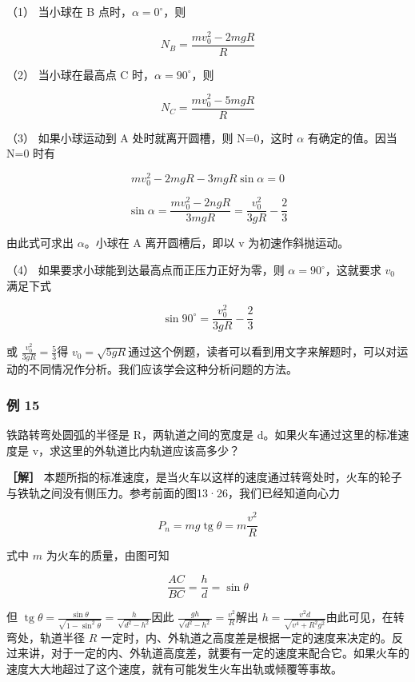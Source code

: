 （1） 当小球在 B 点时，\(\alpha=0^{\circ}\)，则

\[
N _ {B} = \frac {m v _ {0} ^ {2} - 2 m g R}{R}
\]

（2） 当小球在最高点 C 时，\(\alpha=90^{\circ}\)，则

\[
N _ {C} = \frac {m v _ {0} ^ {2} - 5 m g R}{R}
\]

（3） 如果小球运动到 A 处时就离开圆槽，则 N=0，这时 \(\alpha\)
有确定的值。因当 N=0 时有

\[
m v _ {0} ^ {2} - 2 m g R - 3 m g R \sin \alpha = 0
\]

\[
\sin \alpha = \frac {m v _ {0} ^ {2} - 2 n g R}{3 m g R} = \frac {v _ {0} ^ {2}}{3 g R} - \frac {2}{3}
\]

由此式可求出 \(\alpha\)。小球在 A 离开圆槽后，即以 v 为初速作斜抛运动。

（4） 如果要求小球能到达最高点而正压力正好为零，则
\(\alpha=90^{\circ}\)，这就要求 \(v_{0}\) 满足下式

\[
\sin 90 ^ {\circ} = \frac {v _ {0} ^ {2}}{3 g R} - \frac {2}{3}
\]

或 \(\frac{v_0^2}{3gR} = \frac{5}{3}\)得
\(v_{0} = \sqrt{5gR}\)通过这个例题，读者可以看到用文字来解题时，可以对运动的不同情况作分析。我们应该学会这种分析问题的方法。

\subsubsection{例 15}\label{ux4f8b-15-2}

铁路转弯处圆弧的半径是 R，两轨道之间的宽度是
d。如果火车通过这里的标准速度是 v，求这里的外轨道比内轨道应该高多少？

\textbf{［解］}
本题所指的标准速度，是当火车以这样的速度通过转弯处时，火车的轮子与铁轨之间没有侧压力。参考前面的图13·26，我们已经知道向心力

\[
P _ {n} = m g \operatorname{tg} \theta = m \frac {v ^ {2}}{R}
\]

式中 \(m\) 为火车的质量，由图可知

\[
\frac {A C}{B C} = \frac {h}{d} = \sin \theta
\]

但
\(\operatorname{tg}\theta = \frac{\sin\theta}{\sqrt{1 - \sin^2\theta}} = \frac{h}{\sqrt{d^2 - h^2}}\)因此
\(\frac{gh}{\sqrt{d^2 - h^2}} = \frac{v^2}{R}\)解出
\(h = \frac{v^2d}{\sqrt{v^4 + R^2g^2}}\)由此可见，在转弯处，轨道半径
\(R\)
一定时，内、外轨道之高度差是根据一定的速度来决定的。反过来讲，对于一定的内、外轨道高度差，就要有一定的速度来配合它。如果火车的速度大大地超过了这个速度，就有可能发生火车出轨或倾覆等事故。

